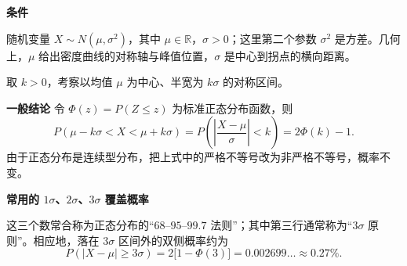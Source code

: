 \begin{statementbox}
	\textbf{\textcolor{CStatement}{条件}}
	\begin{description}[style=nextline, leftmargin=2.8em, labelsep=0.5em, itemsep=0.35em]
		\item[\textbf{\textcolor{CStatement}{条件 1（分布参数）：}}]
			随机变量 $X\sim N(\mu,\sigma^{2})$，其中 $\mu\in\mathbb{R}$，$\sigma>0$；这里第二个参数 $\sigma^{2}$ 是方差。几何上，$\mu$ 给出密度曲线的对称轴与峰值位置，$\sigma$ 是中心到拐点的横向距离。
		\item[\textbf{\textcolor{CStatement}{条件 2（区间倍数）：}}]
			取 $k>0$，考察以均值 $\mu$ 为中心、半宽为 $k\sigma$ 的对称区间。
	\end{description}

	\textbf{\textcolor{CStatement}{一般结论}}
	令 $\Phi(z)=P(Z\le z)$ 为标准正态分布函数，则
	\[
		\boxed{
		P(\mu-k\sigma<X<\mu+k\sigma)
		=P\!\left(\left|\frac{X-\mu}{\sigma}\right|<k\right)
		=2\Phi(k)-1
		}.
	\]
	由于正态分布是连续型分布，把上式中的严格不等号改为非严格不等号，概率不变。

	\medskip
	\textbf{\textcolor{CStatement}{常用的 $1\sigma$、$2\sigma$、$3\sigma$ 覆盖概率}}
	
	这三个数常合称为正态分布的“$68$--$95$--$99.7$ 法则”；其中第三行通常称为“$3\sigma$ 原则”。相应地，落在 $3\sigma$ 区间外的双侧概率约为
	\[
		P(|X-\mu|\ge 3\sigma)=2\bigl[1-\Phi(3)\bigr]
		=0.002699\ldots\approx0.27\%.
	\]
\end{statementbox}
